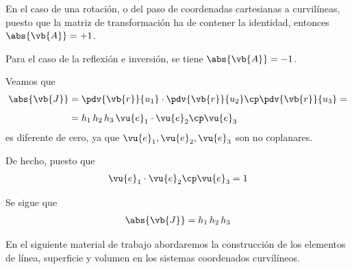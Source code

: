 En el caso de una rotación, o del paso de coordenadas cartesianas a curvilíneas, puesto que la matriz de transformación ha de contener la identidad, entonces $\abs{\vb{A}} = +1$.
 
Para el caso de la reflexión e inversión, se tiene $\abs{\vb{A}} = -1$.

Veamos que
\begin{align*}
\abs{\vb{J}} &= \pdv{\vb{r}}{u_{1}} \cdot \pdv{\vb{r}}{u_{2}} \cp \pdv{\vb{r}}{u_{3}} = \\[0.5em]
&= h_{1} \, h_{2} \, h_{3} \, \vu{e}_{1} \cdot \vu{e}_{2} \cp \vu{e}_{3}
\end{align*}
es diferente de cero, ya que $\vu{e}_{1}, \vu{e}_{2}, \vu{e}_{3}$ son no coplanares.
\par

De hecho, puesto que
\begin{align*}
\vu{e}_{1} \cdot \vu{e}_{2} \cp \vu{e}_{3} = 1
\end{align*}

Se sigue que
\begin{align*}
\abs{\vb{J}} = h_{1} \, h_{2} \, h_{3}
\end{align*}

En el siguiente material de trabajo abordaremos la construcción de los elementos de línea, superficie y volumen en los sistemas coordenados curvilíneos.
